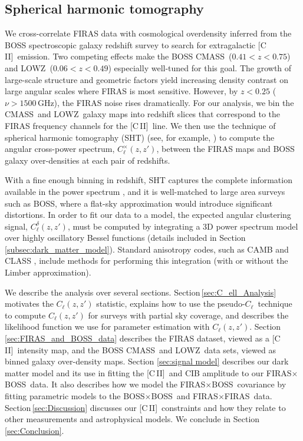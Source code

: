 \documentclass[fleqn,usenatbib]{mnras}
\newcommand{\lowz}{LOWZ}
\newcommand{\cmass}{CMASS}
\newcommand{\cii}{[C{\sc\,II}]}
\newcommand{\pcl}{pseudo-$C_{\ell}$}
\newcommand{\FF}{FIRAS${\times}$FIRAS}
\newcommand{\BB}{BOSS${\times}$BOSS}
\newcommand{\FB}{FIRAS${\times}$BOSS}
\begin{document}
\subsection{Spherical harmonic tomography}

We cross-correlate FIRAS data with cosmological overdensity inferred from the BOSS spectroscopic galaxy redshift survey to search for extragalactic \cii\ emission. Two competing effects make the BOSS \cmass\ ($0.41<z<0.75$) and \lowz\ ($0.06<z<0.49$) especially well-tuned for this goal. The growth of large-scale structure and geometric factors yield increasing density contrast on large angular scales where FIRAS is most sensitive. However, by $z<0.25$ ($\nu > 1500$\,GHz), the FIRAS noise rises dramatically. For our analysis, we bin the \cmass\ and \lowz\ galaxy maps into redshift slices that correspond to the FIRAS frequency channels for the \cii\ line. We then use the technique of spherical harmonic tomography (SHT) (see, for example, \cite{asorey2012recovering, nicola2014three, 2015A&A...578A..10L}) to compute the angular cross-power spectrum, $C_{\ell}^{\times}(z,z')$, between the FIRAS maps and BOSS galaxy over-densities at each pair of redshifts. 

With a fine enough binning in redshift, SHT captures the complete information available in the power spectrum \citep{asorey2012recovering}, and it is well-matched to large area surveys such as BOSS, where a flat-sky approximation would introduce significant distortions. In order to fit our data to a model, the expected angular clustering signal, $C_{\ell}^{\delta}(z,z')$, must be computed by integrating a 3D power spectrum model over highly oscillatory Bessel functions (details included in Section\,\ref{subsec:dark_matter_model}). Standard anisotropy codes, such as CAMB \citep{2011ascl.soft02026L} and CLASS \citep{2013JCAP...11..044D, 2014JCAP...01..042D}, include methods for performing this integration (with or without the Limber approximation). 

We describe the analysis over several sections. Section\,\ref{sec:C_ell_Analysis} motivates the $C_{\ell}(z,z')$ statistic, explains how to use the \pcl\ technique to compute $C_{\ell}(z,z')$ for surveys with partial sky coverage, and describes the likelihood function we use for parameter estimation with $C_{\ell}(z,z')$.
Section\,\ref{sec:FIRAS_and_BOSS_data} describes the FIRAS dataset, viewed as a \cii\ intensity map, and the BOSS \cmass\ and \lowz\ data sets, viewed as binned galaxy over-density maps.
Section \ref{sec:signal model} describes our dark matter model and its use in fitting the \cii\ and CIB amplitude to our \FB\ data. It also describes how we model the \FB\ covariance by fitting parametric models to the \BB\ and \FF\ data.
Section\,\ref{sec:Discussion} discusses our \cii\ constraints and how they relate to other measurements and astrophysical models. We conclude in Section\,\ref{sec:Conclusion}. 
\end{document}

